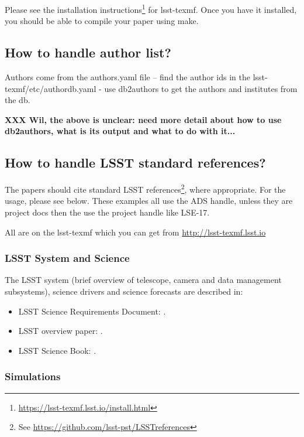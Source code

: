 Please see the installation instructions\footnote{\url{https://lsst-texmf.lsst.io/install.html}} 
for lsst-texmf. Once you have it installed, you should be able to compile your paper
using make. 

\subsection{How to handle author list?} 

Authors come from the authors.yaml file --  find the author ids in the lsst-texmf/etc/authordb.yaml - use db2authors to get the authors and institutes from the db. 

{\bf XXX Wil, the above is unclear: need more detail about how to use db2authors,
what is its output and what to do with it...} 


\subsection{How to handle LSST standard references?} 

The papers should cite standard LSST references\footnote{See \url{https://github.com/lsst-pst/LSSTreferences}}, 
where appropriate. For the usage, please see below.  These examples all use the ADS handle, unless they are 
project docs then the use the project handle like LSE-17.

All are on the lsst-texmf which you can get from \url{http://lsst-texmf.lsst.io}


\subsubsection{LSST System and Science}

The LSST system (brief overview of telescope, camera and data management subsystems),
science drivers and science forecasts are described in:

\begin{itemize}
\item LSST Science Requirements Document: \cite{LPM-17}.
\item LSST overview paper: \cite{2008arXiv0805.2366I}.
\item LSST Science Book: \cite{abell2009lsst}.
\end{itemize}


\subsubsection{Simulations}

